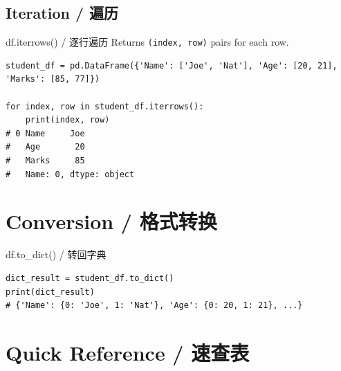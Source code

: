 \documentclass[11pt,a4paper]{article}
\begin{document}
\subsection{Iteration / 遍历}

\begin{examplebox}{df.iterrows() / 逐行遍历}
    Returns \texttt{(index, row)} pairs for each row.
\begin{lstlisting}
student_df = pd.DataFrame({'Name': ['Joe', 'Nat'], 'Age': [20, 21], 'Marks': [85, 77]})

for index, row in student_df.iterrows():
    print(index, row)
# 0 Name     Joe
#   Age       20
#   Marks     85
#   Name: 0, dtype: object
\end{lstlisting}
\end{examplebox}

\section{Conversion / 格式转换}

\begin{examplebox}{df.to\_dict() / 转回字典}
\begin{lstlisting}
dict_result = student_df.to_dict()
print(dict_result)
# {'Name': {0: 'Joe', 1: 'Nat'}, 'Age': {0: 20, 1: 21}, ...}
\end{lstlisting}
\end{examplebox}

\section{Quick Reference / 速查表}
\end{document}
